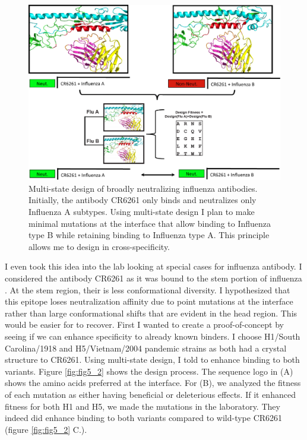 \begin{figure}[!t]
   \centering
   \includegraphics[width=.9\textwidth]{images/chapter5/figure5_1.pdf}
   \caption[Multi-state Design of Broadly Neutralizing Influenza Antibodies]{Multi-state design of broadly neutralizing influenza antibodies. Initially, the antibody CR6261 only binds and neutralizes only Influenza A subtypes. Using multi-state design I plan to make minimal mutations at the interface that allow binding to Influenza type B while retaining binding to Influenza type A. This principle allows me to design in cross-specificity.}
       \label{fig:fig5_1}
\end{figure}


I even took this idea into the lab looking at special cases for influenza antibody. I considered the antibody CR6261 as it was bound to the stem portion of influenza \citep{Corti:2011ku}. At the stem region, their is less conformational diversity. I hypothesized that this epitope loses neutralization affinity due to point mutations at the interface rather than large conformational shifts that are evident in the head region. This would be easier for \rosettadesign to recover. First I wanted to create a proof-of-concept by seeing if we can enhance specificity to already known binders. I choose H1/South Carolina/1918 and H5/Vietnam/2004 pandemic strains as both had a crystal structure to CR6261. Using multi-state design, I told \rosettadesign to enhance binding to both variants. Figure \ref{fig:fig5_2} shows the design process. The sequence logo in (A) shows the amino acids preferred at the interface. For (B), we analyzed the fitness of each mutation as either having beneficial or deleterious effects. If it enhanced fitness for both H1 and H5, we made the mutations in the laboratory. They indeed did enhance binding to both variants compared to wild-type CR6261 (figure \ref{fig:fig5_2} C.).


